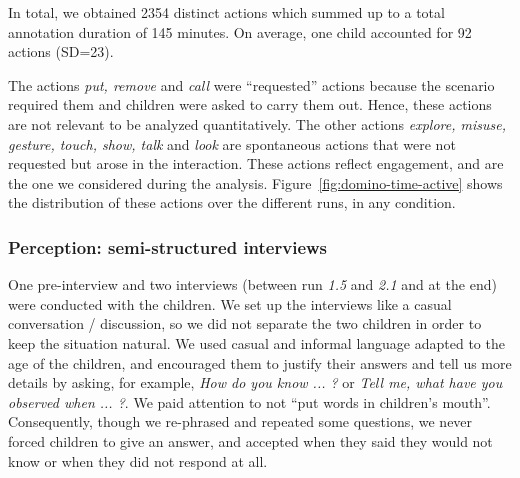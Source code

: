 \documentclass{sig-alternate}
\begin{document}
In total, we obtained 2354 distinct actions which summed up to a total
annotation duration of 145 minutes. On average, one child accounted for 92
actions (SD=23).

The actions \textit{put, remove} and \textit{call} were ``requested'' actions
because the scenario required them and children were asked to carry them out.
Hence, these actions are not relevant to be analyzed quantitatively. The other
actions \textit{explore, misuse, gesture, touch, show, talk} and \textit{look}
are spontaneous actions that were not requested but arose in the interaction.
These actions reflect engagement, and are the one we considered during the
analysis. Figure~\ref{fig:domino-time-active} shows the distribution of these
actions over the different runs, in any condition.

\subsubsection{Perception: semi-structured interviews}

One pre-interview and two interviews (between run \emph{1.5} and \emph{2.1} and
at the end) were conducted with the children.  We set up the interviews like a
casual conversation / discussion, so we did not separate the two children in
order to keep the situation natural. We used casual and informal language
adapted to the age of the children, and encouraged them to justify their answers
and tell us more details by asking, for example, \textit{How do you know ... ?}
or \textit{Tell me, what have you observed when ... ?}. We paid attention to not
``put words in children's mouth''. Consequently, though we re-phrased and
repeated some questions, we never forced children to give an answer, and
accepted when they said they would not know or when they did not respond at all.	
\end{document}
